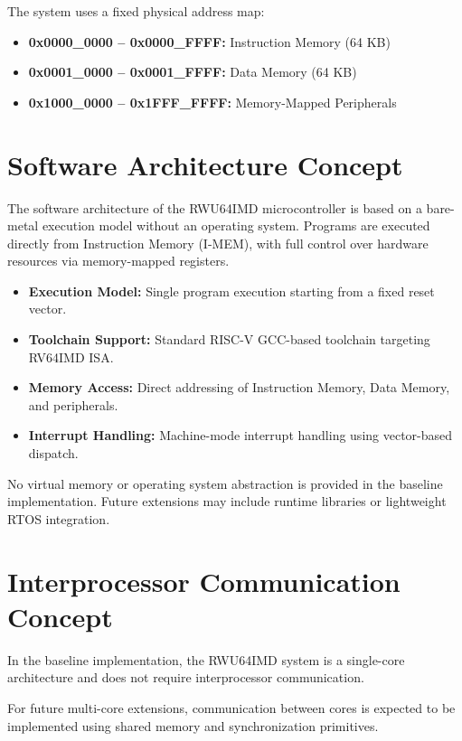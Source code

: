 The system uses a fixed physical address map:

\begin{itemize}
    \item \textbf{0x0000\_0000 – 0x0000\_FFFF:} Instruction Memory (64 KB)
    \item \textbf{0x0001\_0000 – 0x0001\_FFFF:} Data Memory (64 KB)
    \item \textbf{0x1000\_0000 – 0x1FFF\_FFFF:} Memory-Mapped Peripherals
\end{itemize}

\section{Software Architecture Concept}

The software architecture of the RWU64IMD microcontroller is based on a
bare-metal execution model without an operating system. Programs are executed
directly from Instruction Memory (\gls{I-MEM}), with full control over hardware
resources via memory-mapped registers.

\begin{itemize}
    \item \textbf{Execution Model:}
          Single program execution starting from a fixed reset vector.
    \item \textbf{Toolchain Support:}
          Standard RISC-V GCC-based toolchain targeting RV64IMD ISA.
    \item \textbf{Memory Access:}
          Direct addressing of Instruction Memory, Data Memory, and peripherals.
    \item \textbf{Interrupt Handling:}
          Machine-mode interrupt handling using vector-based dispatch.
\end{itemize}

No virtual memory or operating system abstraction is provided in the baseline
implementation. Future extensions may include runtime libraries or lightweight
RTOS integration.

\section{Interprocessor Communication Concept}

In the baseline implementation, the RWU64IMD system is a single-core architecture
and does not require interprocessor communication.

For future multi-core extensions, communication between cores is expected to be
implemented using shared memory and synchronization primitives.

